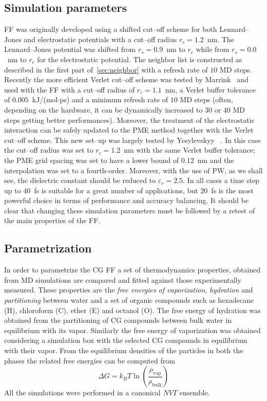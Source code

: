 \subsection{Simulation parameters}
\martini \ac{FF} was originally developed using a shifted cut--off scheme for both Lennard--Jones and electrostatic potentials with a cut--off radius $r_c = 1.2$~nm. The Lennard--Jones potential was shifted from $r_s = 0.9$~nm to $r_c$ while from $r_s = 0.0$~nm to $r_c$ for the electrostatic potential. The neighbor list is constructed as described in the first part of~\ref{sec:neighbor} with a refresh rate of $10$ \ac{MD} steps. Recently the more efficient Verlet cut--off scheme was tested by Marrink \etal\, \cite{MartiniReview} and used with the \martini \ac{FF} with a cut--off radius of $r_c = 1.1$~nm, a Verlet buffer tolerance of $0.005$~kJ/(mol$\cdot$ps) and a minimum refresh rate of $10$ \ac{MD} steps (often, depending on the hardware, it can be dynamically increased to $30$ or $40$ \ac{MD} steps getting better performances).  Moreover, the treatment of the electrostatic interaction can be safely updated to the \ac{PME} method together with the Verlet cut--off scheme. This new set--up was largely tested by Yesylevskyy \etal\, \cite{PW}. In this case the cut--off radius was set to $r_c = 1.2$~nm with the same Verlet buffer tolerance; the \ac{PME} grid spacing was set to have a lower bound of $0.12$~nm and the interpolation was set to a fourth-order. Moreover, with the use of \ac{PW}, as we shall see, the dielectric constant should be reduced to $\varepsilon_r = 2.5$. In all cases a time step up to $40$~fs is suitable for a great number of applications, but $20$~fs is the most powerful choice in terms of performance and accuracy balancing. It should be clear that changing these simulation parameters must be followed by a retest of the main properties of the \martini \ac{FF}.

\subsection{Parametrization}
In order to parametrize the \martini \ac{CG} \ac{FF} a set of thermodynamics properties, obtained from \ac{MD} simulations are compared and fitted against those experimentally measured. These properties are the \textit{free energies of vaporization}, \textit{hydration} and \textit{partitioning} between water and a set of organic compounds such as hexadecane (H), chloroform (C), ether (E) and octanol (O). The free energy of hydration was obtained from the partitioning of \ac{CG} compounds between bulk water in equilibrium with its vapor. Similarly the free energy of vaporization was obtained considering a simulation box with the selected \ac{CG} compounds in equilibrium with their vapor. From the equilibrium densities of the particles in both the phases the related free energies can be computed from
\begin{equation*}
	\Delta G = k_B T\ln \left ( \frac{\rho_{\text{vap}}}{\rho_{\text{bulk}}} \right )
\end{equation*}
All the simulations were performed in a canonical $NVT$ ensemble.

